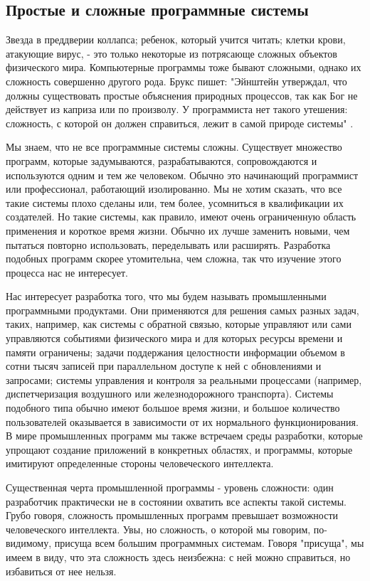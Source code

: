 \documentclass[11pt]{article}
\begin{document}
\subsection{\textbf{Простые и сложные программные системы }}
Звезда в преддверии коллапса; ребенок, который учится читать; клетки крови, атакующие вирус, - это только некоторые из потрясающе сложных объектов физического мира. Компьютерные программы тоже бывают сложными, однако их сложность совершенно другого рода. Брукс пишет: "Эйнштейн утверждал, что должны существовать простые объяснения природных процессов, так как Бог не действует из каприза или по произволу. У программиста нет такого утешения: сложность, с которой он должен справиться, лежит в самой природе системы" \cite[p.12]{1}. \par
Мы знаем, что не все программные системы сложны. Существует множество программ, которые задумываются, разрабатываются, сопровождаются и используются одним и тем же человеком. Обычно это начинающий программист или профессионал, работающий изолированно. Мы не хотим сказать, что все такие системы плохо сделаны или, тем более, усомниться в квалификации их создателей. Но такие системы, как правило, имеют очень ограниченную область применения и короткое время жизни. Обычно их лучше заменить новыми, чем пытаться повторно использовать, переделывать или расширять. Разработка подобных программ скорее утомительна, чем сложна, так что изучение этого процесса нас не интересует. \par
Нас интересует разработка того, что мы будем называть промышленными программными продуктами. Они применяются для решения самых разных задач, таких, например, как системы с обратной связью, которые управляют или сами управляются событиями физического мира и для которых ресурсы времени и памяти ограничены; задачи поддержания целостности информации объемом в сотни тысяч записей при параллельном доступе к ней с обновлениями и запросами; системы управления и контроля за реальными процессами (например, диспетчеризация воздушного или железнодорожного транспорта). Системы подобного типа обычно имеют большое время жизни, и большое количество пользователей оказывается в зависимости от их нормального функционирования. В мире промышленных программ мы также встречаем среды разработки, которые упрощают создание приложений в конкретных областях, и программы, которые имитируют определенные стороны человеческого интеллекта. \par
Существенная черта промышленной программы - уровень сложности: один разработчик практически не в состоянии охватить все аспекты такой системы. Грубо говоря, сложность промышленных программ превышает возможности человеческого интеллекта. Увы, но сложность, о которой мы говорим, по-видимому, присуща всем большим программных системам. Говоря "присуща", мы имеем в виду, что эта сложность здесь неизбежна: с ней можно справиться, но избавиться от нее нельзя. \par
\end{document}
